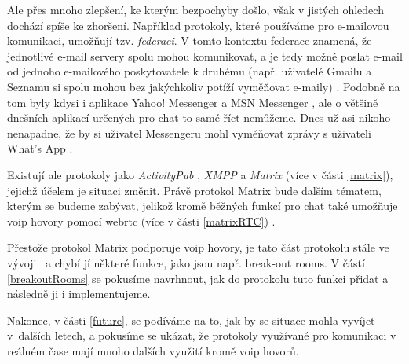 Ale přes mnoho zlepšení, ke kterým bezpochyby došlo, však v jistých ohledech
dochází spíše ke zhoršení. Například protokoly, které používáme pro e-mailovou
komunikaci, umožňují tzv. \textit{federaci}. V tomto kontextu federace znamená,
že jednotlivé e-mail servery spolu mohou komunikovat, a je tedy možné poslat
e-mail od jednoho e-mailového poskytovatele k druhému (např. uživatelé Gmailu a
Seznamu si spolu mohou bez jakýchkoliv potíží vyměňovat e-maily)
\parencite{MatrixORG-FAQ}. Podobně na tom byly kdysi i aplikace Yahoo! Messenger
a MSN Messenger \parencite{BetaNews-MSYahooToLinkIMNets}, ale o většině dnešních
aplikací určených pro chat to samé říct nemůžeme. Dnes už asi nikoho nenapadne,
že by si uživatel Messengeru mohl vyměňovat zprávy s uživateli What's App
\parencite{9To5Mac-InteroperabilityNightmareAndDream}.

Existují ale protokoly jako \textit{ActivityPub} \parencite{W3ORG-ActivityPub},
\textit{XMPP} \parencite{XMPPORG-Homepage} a \textit{Matrix}
\parencite{MatrixORG-Homepage} (více v části \ref{matrix}), jejichž účelem je
situaci změnit. Právě protokol Matrix bude dalším tématem, kterým se budeme
zabývat, jelikož kromě běžných funkcí pro chat také umožňuje \gls{voip} hovory
pomocí \gls{webrtc} (více v části \ref{matrixRTC})
\parencite{MatrixORG-Homepage,MatrixORG-Spec}.

Přestože protokol Matrix podporuje \gls{voip} hovory, je tato část protokolu
stále ve vývoji~\parencite{GitHub-MSC3401,GitHub-MSC3898} a chybí jí některé
funkce, jako jsou např. break-out rooms. V částí \ref{breakoutRooms} se pokusíme
navrhnout, jak do protokolu tuto funkci přidat a následně ji i implementujeme.

Nakonec, v části \ref{future}, se podíváme na to, jak by se situace mohla
vyvíjet v~dalších letech, a pokusíme se ukázat, že protokoly využívané pro
komunikaci v reálném čase mají mnoho dalších využití kromě \gls{voip} hovorů.
